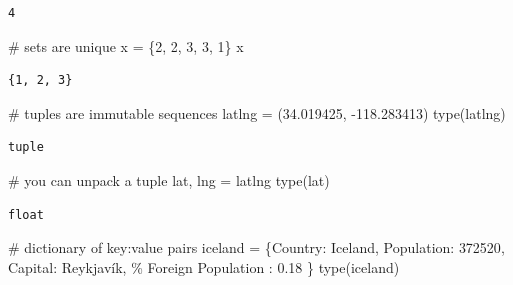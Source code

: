 \documentclass[
  letterpaper,
  DIV=11,
  numbers=noendperiod]{scrreprt}
\newenvironment{Shaded}{\begin{snugshade}}{\end{snugshade}}
\newcommand{\BuiltInTok}[1]{\textcolor[rgb]{0.00,0.23,0.31}{#1}}
\newcommand{\CommentTok}[1]{\textcolor[rgb]{0.37,0.37,0.37}{#1}}
\newcommand{\DecValTok}[1]{\textcolor[rgb]{0.68,0.00,0.00}{#1}}
\newcommand{\FloatTok}[1]{\textcolor[rgb]{0.68,0.00,0.00}{#1}}
\newcommand{\NormalTok}[1]{\textcolor[rgb]{0.00,0.23,0.31}{#1}}
\newcommand{\OperatorTok}[1]{\textcolor[rgb]{0.37,0.37,0.37}{#1}}
\newcommand{\SpecialCharTok}[1]{\textcolor[rgb]{0.37,0.37,0.37}{#1}}
\newcommand{\StringTok}[1]{\textcolor[rgb]{0.13,0.47,0.30}{#1}}
\begin{document}
\begin{verbatim}
4
\end{verbatim}

\begin{Shaded}
\begin{Highlighting}[]
\CommentTok{\# sets are unique}
\NormalTok{x }\OperatorTok{=}\NormalTok{ \{}\DecValTok{2}\NormalTok{, }\DecValTok{2}\NormalTok{, }\DecValTok{3}\NormalTok{, }\DecValTok{3}\NormalTok{, }\DecValTok{1}\NormalTok{\}}
\NormalTok{x}
\end{Highlighting}
\end{Shaded}

\begin{verbatim}
{1, 2, 3}
\end{verbatim}

\begin{Shaded}
\begin{Highlighting}[]
\CommentTok{\# tuples are immutable sequences}
\NormalTok{latlng }\OperatorTok{=}\NormalTok{ (}\FloatTok{34.019425}\NormalTok{, }\OperatorTok{{-}}\FloatTok{118.283413}\NormalTok{)}
\BuiltInTok{type}\NormalTok{(latlng)}
\end{Highlighting}
\end{Shaded}

\begin{verbatim}
tuple
\end{verbatim}

\begin{Shaded}
\begin{Highlighting}[]
\CommentTok{\# you can unpack a tuple}
\NormalTok{lat, lng }\OperatorTok{=}\NormalTok{ latlng}
\BuiltInTok{type}\NormalTok{(lat)}
\end{Highlighting}
\end{Shaded}

\begin{verbatim}
float
\end{verbatim}

\begin{Shaded}
\begin{Highlighting}[]
\CommentTok{\# dictionary of key:value pairs}
\NormalTok{iceland }\OperatorTok{=}\NormalTok{ \{}\StringTok{\textquotesingle{}Country\textquotesingle{}}\NormalTok{: }\StringTok{\textquotesingle{}Iceland\textquotesingle{}}\NormalTok{, }\StringTok{\textquotesingle{}Population\textquotesingle{}}\NormalTok{: }\DecValTok{372520}\NormalTok{, }\StringTok{\textquotesingle{}Capital\textquotesingle{}}\NormalTok{: }\StringTok{\textquotesingle{}Reykjavík\textquotesingle{}}\NormalTok{, }\StringTok{\textquotesingle{}}\SpecialCharTok{\% F}\StringTok{oreign Population\textquotesingle{}}\NormalTok{ : }\FloatTok{0.18}\NormalTok{ \}}
\BuiltInTok{type}\NormalTok{(iceland)}
\end{Highlighting}
\end{Shaded}
\end{document}

